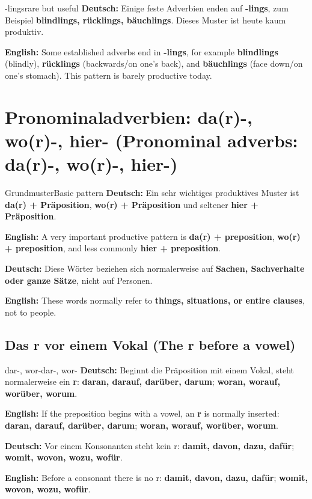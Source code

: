 \documentclass[a4paper,11pt]{article}
\newcommand{\GermanText}[1]{\textbf{Deutsch: }#1\par}
\newcommand{\EnglishText}[1]{{\small\color{SoftGray}\textbf{English: }#1\par}}
\newcommand{\BSection}[2]{\section{#1 \textnormal{\small (#2)}}}
\newcommand{\BSubsection}[2]{\subsection{#1 \textnormal{\small (#2)}}}
\begin{document}
\begin{grammarentry}{-lings}{rare but useful}
\GermanText{Einige feste Adverbien enden auf \textbf{-lings}, zum Beispiel \textbf{blindlings, rücklings, bäuchlings}. Dieses Muster ist heute kaum produktiv.}
\EnglishText{Some established adverbs end in \textbf{-lings}, for example \textbf{blindlings} (blindly), \textbf{rücklings} (backwards/on one's back), and \textbf{bäuchlings} (face down/on one's stomach). This pattern is barely productive today.}
\end{grammarentry}

\BSection{Pronominaladverbien: da(r)-, wo(r)-, hier-}{Pronominal adverbs: da(r)-, wo(r)-, hier-}

\begin{grammarentry}{Grundmuster}{Basic pattern}
\GermanText{Ein sehr wichtiges produktives Muster ist \textbf{da(r) + Präposition}, \textbf{wo(r) + Präposition} und seltener \textbf{hier + Präposition}.}
\EnglishText{A very important productive pattern is \textbf{da(r) + preposition}, \textbf{wo(r) + preposition}, and less commonly \textbf{hier + preposition}.}

\GermanText{Diese Wörter beziehen sich normalerweise auf \textbf{Sachen, Sachverhalte oder ganze Sätze}, nicht auf Personen.}
\EnglishText{These words normally refer to \textbf{things, situations, or entire clauses}, not to people.}
\end{grammarentry}

\BSubsection{Das r vor einem Vokal}{The r before a vowel}

\begin{grammarentry}{dar-, wor-}{dar-, wor-}
\GermanText{Beginnt die Präposition mit einem Vokal, steht normalerweise ein \textbf{r}: \textbf{daran, darauf, darüber, darum}; \textbf{woran, worauf, worüber, worum}.}
\EnglishText{If the preposition begins with a vowel, an \textbf{r} is normally inserted: \textbf{daran, darauf, darüber, darum}; \textbf{woran, worauf, worüber, worum}.}

\GermanText{Vor einem Konsonanten steht kein r: \textbf{damit, davon, dazu, dafür}; \textbf{womit, wovon, wozu, wofür}.}
\EnglishText{Before a consonant there is no r: \textbf{damit, davon, dazu, dafür}; \textbf{womit, wovon, wozu, wofür}.}
\end{grammarentry}
\end{document}
